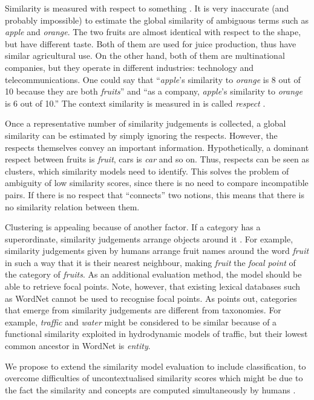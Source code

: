 \documentclass[11pt]{article}
\begin{document}
Similarity is measured with respect to something \cite{Roth1983346,Sadler1993}. It is very inaccurate (and probably impossible) to estimate the global similarity of ambiguous terms such as \textit{apple} and \textit{orange}. The two fruits are almost identical with respect to the shape, but have different taste. Both of them are used for juice production, thus have similar agricultural use. On the other hand, both of them are multinational companies, but they operate in different industries: technology and telecommunications. One could say that ``\textit{apple}'s similarity to \textit{orange} is 8 out of 10 because they are both \textit{fruits}'' and ``as a company, \textit{apple}'s similarity to \textit{orange} is 6 out of 10.'' The context similarity is measured in is called \emph{respect} \cite{hahn1997concepts}.

Once a representative number of similarity judgements is collected, a global similarity can be estimated by simply ignoring the respects. However, the respects themselves convey an important information. Hypothetically, a dominant respect between fruits is \textit{fruit}, cars is \textit{car} and so on. Thus, respects can be seen as clusters, which similarity models need to identify. This solves the problem of ambiguity of low similarity scores, since there is no need to compare incompatible pairs. If there is no respect that ``connects'' two notions, this means that there is no similarity relation between them.

Clustering is appealing because of another factor. If a category has a superordinate, similarity judgements arrange objects around it \cite{1986-13502-00119860101}. For example, similarity judgements given by humans arrange fruit names around the word \textit{fruit} in such a way that it is their nearest neighbour, making \textit{fruit} the \emph{focal point} of the category of \textit{fruits}. As an additional evaluation method, the model should be able to retrieve focal points. Note, however, that existing lexical databases such as WordNet \cite{Miller:1995:WLD:219717.219748} cannot be used to recognise focal points. As  points out, categories that emerge from similarity judgements are different from taxonomies. For example, \textit{traffic} and \textit{water} might be considered to be similar because of a functional similarity exploited in hydrodynamic models of traffic, but their lowest common ancestor in WordNet is \textit{entity}.

We propose to extend the similarity model evaluation to include classification, to overcome difficulties of uncontextualised similarity scores which might be due to the fact the similarity and concepts are computed simultaneously by humans \cite{hahn1997concepts}.
\end{document}

